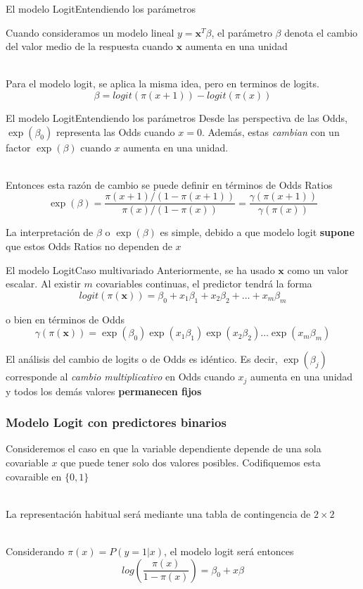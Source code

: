 \documentclass[]{beamer}
\begin{document}
\begin{frame}{El modelo Logit}{Entendiendo los parámetros}

    Cuando consideramos un modelo lineal $y=\mathbf{x}^T\beta$, el parámetro $\beta$ 
    denota el cambio del valor medio de la respuesta cuando $\mathbf{x}$ aumenta en 
    una unidad\\~\  

    Para el modelo logit, se aplica la misma idea, pero en terminos de logits.
    $$\beta = logit(\pi(x+1)) - logit(\pi(x))$$

\end{frame}

\begin{frame}{El modelo Logit}{Entendiendo los parámetros}
    Desde las perspectiva de las Odds, $\exp(\beta_0)$ representa las Odds cuando $x=0$. Además, estas 
    \textit{cambian} con un factor $\exp(\beta)$ cuando $x$ aumenta en una unidad.\\~\ 

    Entonces esta razón de cambio se puede definir en términos de Odds Ratios 
    $$\exp(\beta)=\dfrac{\pi(x+1)/(1-\pi(x+1))}{\pi(x)/(1-\pi(x))}=\frac{\gamma(\pi(x+1))}{\gamma(\pi(x)    )}$$

    La interpretación de $\beta$ o $\exp(\beta )$ es simple, debido a que modelo logit 
    \textbf{supone} que estos Odds Ratios no dependen de $x$
\end{frame}


\begin{frame}{El modelo Logit}{Caso multivariado}
    Anteriormente, se ha usado $\mathbf{x}$ como un valor escalar. Al existir $m$ covariables continuas,
    el predictor tendrá la forma 
    $$logit(\pi(\mathbf{x})) = \beta_0+x_1\beta_1+x_2\beta_2+\ldots +x_m\beta_m$$

    o bien en términos de Odds
    $$\gamma(\pi(\mathbf{x})) = \exp(\beta_0)\exp(x_1\beta_1)\exp(x_2\beta_2)\ldots \exp(x_m\beta_m)$$

    El análisis del cambio de logits o de Odds es idéntico.  Es decir, $\exp(\beta_j)$ corresponde al \textit{cambio multiplicativo}
    en Odds cuando $x_j$ aumenta en una unidad y todos los demás valores \textbf{permanecen fijos}
\end{frame}

\begin{frame}
    \frametitle{Modelo Logit con predictores binarios}

    Consideremos el caso en que la variable dependiente depende de una sola covariable $x$ que puede tener 
    solo dos valores posibles. Codifiquemos esta covaraible en $\{0,1\}$\\~\  

    La representación habitual será mediante una tabla de contingencia de $2\times 2$\\~\   

    Considerando $\pi(x)=P(y=1|x)$, el modelo logit será entonces
    $$log\left( \frac{\pi(x)}{1-\pi(x)}\right)=\beta_0+x\beta$$
    

\end{frame}
\end{document}
